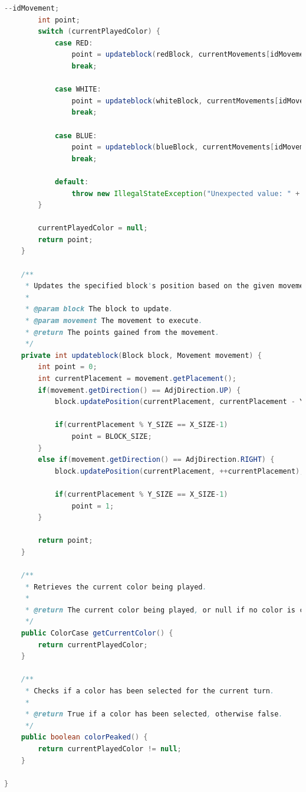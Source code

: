 \documentclass[a4paper,11pt]{article}
\begin{document}
\begin{lstlisting}[language=Java, breaklines=true]
        --idMovement;
        int point;
        switch (currentPlayedColor) {
            case RED:
                point = updateblock(redBlock, currentMovements[idMovement]);
                break;
            
            case WHITE:
                point = updateblock(whiteBlock, currentMovements[idMovement]);
                break;

            case BLUE:
                point = updateblock(blueBlock, currentMovements[idMovement]);
                break;
            
            default:
                throw new IllegalStateException("Unexpected value: " + currentPlayedColor);
        }

        currentPlayedColor = null;
        return point;
    }

    /**
     * Updates the specified block's position based on the given movement and returns the points gained.
     *
     * @param block The block to update.
     * @param movement The movement to execute.
     * @return The points gained from the movement.
     */
    private int updateblock(Block block, Movement movement) {
        int point = 0;
        int currentPlacement = movement.getPlacement();
        if(movement.getDirection() == AdjDirection.UP) {
            block.updatePosition(currentPlacement, currentPlacement - Y_SIZE);
            
            if(currentPlacement % Y_SIZE == X_SIZE-1)
                point = BLOCK_SIZE;
        }
        else if(movement.getDirection() == AdjDirection.RIGHT) {
            block.updatePosition(currentPlacement, ++currentPlacement);

            if(currentPlacement % Y_SIZE == X_SIZE-1)
                point = 1;
        }

        return point;
    }

    /**
     * Retrieves the current color being played.
     *
     * @return The current color being played, or null if no color is currently being played.
     */
    public ColorCase getCurrentColor() {
        return currentPlayedColor;
    }

    /**
     * Checks if a color has been selected for the current turn.
     *
     * @return True if a color has been selected, otherwise false.
     */
    public boolean colorPeaked() {
        return currentPlayedColor != null;
    }

}


\end{lstlisting}
\newpage
\end{document}
